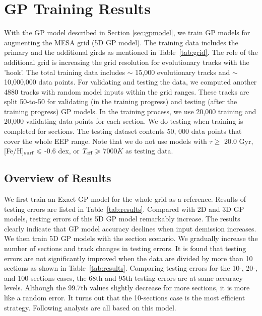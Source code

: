 \section{GP Training Results}\label{sec:results}

With the GP model described in Section \ref{sec:gpmodel},  we train GP models for augmenting the MESA grid (5D GP model). The training data includes the primary and the additional girds as mentioned in Table~\ref{tab:grid}. The role of the additional grid is increasing the grid resolution for evolutionary tracks with the 'hook'. 
The total training data includes $\sim$ 15,000 evolutionary tracks and $\sim$ 10,000,000 data points. For validating and testing the data, we computed another 4880 tracks with random model inputs within the grid ranges. These tracks are split 50-to-50 for validating (in the training progress) and testing (after the training progress) GP models.
In the training process, we use 20,000 training and 20,000 validating data points for each section. 
We do testing when training is completed for sections. The testing dataset contents 50, 000 data points that cover the whole EEP range. Note that we do not use models with $\tau \geq$ 20.0 Gyr, [Fe/H]$_{\rm surf} \leq$ -0.6 dex, or $T_{\rm eff} \geq$ 7000$K$ as testing data. 

\subsection{Overview of Results}

We first train an Exact GP model for the whole grid as a reference. Results of testing errors are listed in Table~\ref{tab:results}. Compared with  2D and 3D GP models, testing errors of this 5D GP model remarkably increase. The results clearly indicate that GP model accuracy declines when input demission increases. 
%
We then train 5D GP models with the section scenario. We gradually increase the number of sections and track changes in testing errors. 
It is found that testing errors are not significantly improved when the data are divided by more than 10 sections as shown in Table~\ref{tab:results}. Comparing testing errors for the 10-, 20-, and 100-sections cases, the 68th and 95th testing errors are at same accuracy levels. Although the 99.7th values slightly decrease for more sections, it is more like a random error.  It turns out that the 10-sections case is the most efficient strategy. Following analysis are all based on this model.   

